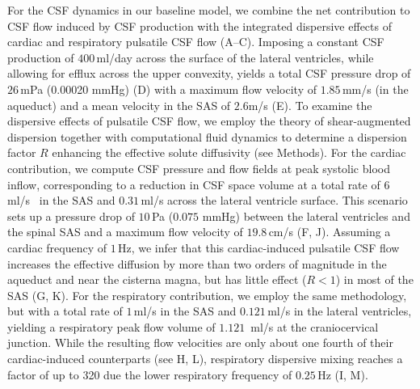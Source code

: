 \documentclass[fleqn,10pt]{wlscirep}
\begin{document}
For the CSF dynamics in our baseline model, we combine the net
contribution to CSF flow induced by CSF production with the integrated
dispersive effects of cardiac and respiratory pulsatile CSF flow
(A--C). Imposing a constant CSF production of
$400\,$ml/day across the surface of the lateral ventricles, while
allowing for efflux across the upper convexity, yields a total CSF
pressure drop of $26\,$mPa (0.00020 mmHg) (D) with a
maximum flow velocity of $1.85\,$mm/s (in the aqueduct) and a mean
velocity in the SAS of $2.6$\textmu m/s (E). To examine the
dispersive effects of pulsatile CSF flow, we employ the theory of
shear-augmented dispersion together with computational fluid dynamics
to determine a dispersion factor $R$ enhancing the effective solute
diffusivity (see Methods). For the cardiac contribution, we compute
CSF pressure and flow fields at peak systolic blood inflow,
corresponding to a reduction in CSF space volume at a total rate of
$6\,$ml/s~\cite{baledent2014imaging, causemann2022human} in the SAS
and $0.31\,$ml/s across the lateral ventricle
surface\cite{vinje2019respiratory}. This scenario sets up a pressure
drop of $10\,$Pa ($0.075$ mmHg) between the lateral ventricles and the
spinal SAS and a maximum flow velocity of $19.8\,$cm/s
(F, J). Assuming a cardiac frequency of $1\,$Hz, we
infer that this cardiac-induced pulsatile CSF flow increases the
effective diffusion by more than two orders of magnitude in the
aqueduct and near the cisterna magna, but has little effect ($R <
1$) in most of the SAS (G, K). For the respiratory
contribution, we employ the same methodology, but with a total rate of
$1\,$ml/s \cite{gutierrez2022effect} in the SAS and $0.121\,$ml/s
\cite{liu2024using} in the lateral ventricles, yielding a respiratory
peak flow volume of $1.121\,$ ml/s at the craniocervical
junction. While the resulting flow velocities are only about one
fourth of their cardiac-induced counterparts (see H, L),
respiratory dispersive mixing reaches a factor of up to 320 due the
lower respiratory frequency of $0.25\,$Hz (I, M).
\end{document}

